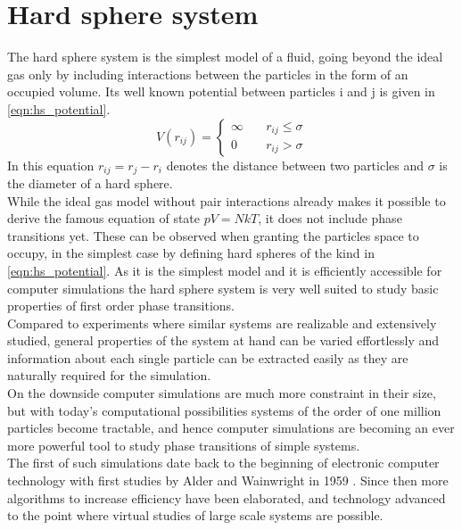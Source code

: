 
\label{chp:theory}

\section{Hard sphere system}
\label{sec:HS_system}
The hard sphere system is the simplest model of a fluid, going beyond the ideal gas only by including interactions between the particles in the form of an occupied volume. Its well known potential between particles i and j is given in \autoref{eqn:hs_potential}.
\begin{equation}
\label{eqn:hs_potential}
V(r_{ij})=%
\begin{cases}
\infty \quad & r_{ij} \le \sigma \\
0 \quad & r_{ij} > \sigma
\end{cases}
\end{equation}
In this equation $r_{ij} = r_j - r_i$ denotes the distance between two particles and $\sigma$ is the diameter of a hard sphere.\\

While the ideal gas model without pair interactions already makes it possible to derive the famous equation of state $pV=NkT$, it does not include phase transitions yet. These can be observed when granting the particles space to occupy, in the simplest case by defining hard spheres of the kind in \autoref{eqn:hs_potential}. As it is the simplest model and it is efficiently accessible for computer simulations the hard sphere system is very well suited to study basic properties of first order phase transitions.\\ 

Compared to experiments where similar systems are realizable and extensively studied, general properties of the system at hand can be varied effortlessly and information about each single particle can be extracted easily as they are naturally required for the simulation.\\

On the downside computer simulations are much more constraint in their size, but with today's computational possibilities systems of the order of one million particles become tractable, and hence computer simulations are becoming an ever more powerful tool to study phase transitions of simple systems.\\

The first of such simulations date back to the beginning of electronic computer technology with first studies by Alder and Wainwright in 1959 \cite{Alders59}. Since then more algorithms to increase efficiency have been elaborated, and technology advanced to the point where virtual studies of large scale systems are possible.

